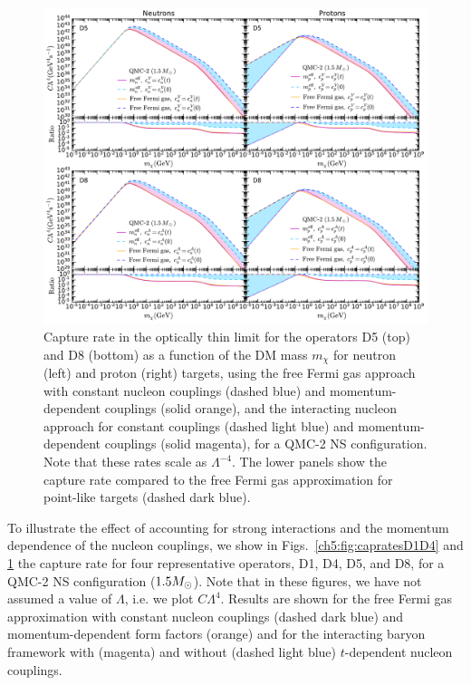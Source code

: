 \begin{figure}[t!bp] 
\centering
\includegraphics[width=\textwidth]{capture_3/C_mDM_N_QMC_D5_D8_ratio.pdf}
\caption[Capture rate in the optically thin limit for the operators D5 (top) and D8 (bottom) as a function of the DM mass $m_\chi$ for neutron (left) and proton (right) targets, for a QMC-2 NS configuration.]{
Capture rate in the optically thin limit for the operators D5 (top) and D8 (bottom) as a function of the DM mass $m_\chi$ for neutron (left) and proton (right) targets,
using the free Fermi gas approach with constant nucleon couplings (dashed blue) and momentum-dependent couplings (solid orange), and the interacting nucleon approach for constant couplings (dashed light blue)  and momentum-dependent couplings (solid magenta), for a QMC-2 NS configuration. 
Note that these rates scale as $\Lambda^{-4}$. 
The lower panels show the capture rate compared to the free Fermi gas approximation for point-like targets (dashed dark blue). 
}
\label{ch5:fig:capratesD5D8}
\end{figure} 

To illustrate the effect of accounting for strong interactions and the momentum dependence of the nucleon couplings, we show in  Figs.~\ref{ch5:fig:capratesD1D4} and \ref{ch5:fig:capratesD5D8} the capture rate for four representative operators, D1, D4, D5, and D8, for a QMC-2 NS configuration ($1.5M_\odot$). 
Note that in these figures, we have not assumed a value of $\Lambda$, i.e. we plot $C \Lambda^4$. 
Results are shown for the free Fermi gas approximation with constant nucleon couplings (dashed dark blue) and momentum-dependent form factors (orange) and for the interacting baryon framework with (magenta) and without (dashed light blue) $t$-dependent nucleon couplings.
 

